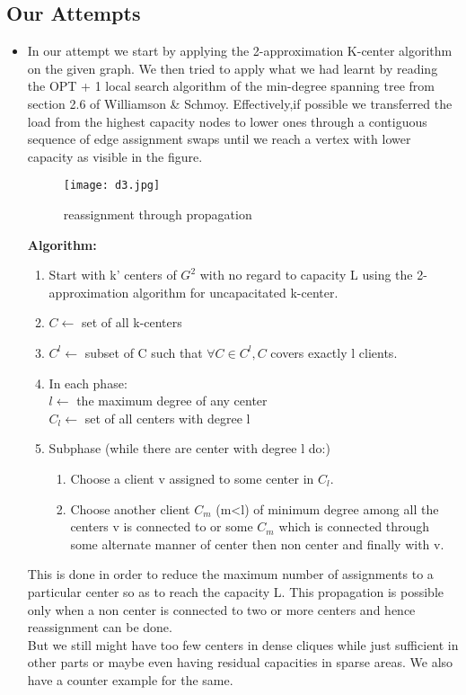 \documentclass[12pt,a4paper,onecolumn]{article}
\begin{document}
\subsection{Our Attempts}
\begin{itemize}
\item In our attempt we start by applying the 2-approximation K-center algorithm on the given graph. We then tried to apply what we had learnt by reading the OPT + 1 local search algorithm of the min-degree spanning tree from section 2.6 of Williamson \& Schmoy. Effectively,if possible we transferred the load from the highest capacity nodes to lower ones through a contiguous sequence of edge assignment swaps until we reach a vertex with lower capacity as visible in the figure. \\
\begin{figure}
\begin{center}
\texttt{[image: d3.jpg]}
  \caption{reassignment through propagation}
  \label{Figure 8}
\end{center}
\end{figure}
\textbf{Algorithm:}
\begin{enumerate}
\item Start with k' centers of $G^2$ with no regard to capacity L using the 2-approximation algorithm for uncapacitated k-center.
\item $C \leftarrow$ set of all k-centers
\item $C^l \leftarrow$ subset of C such that $\forall C \in C^l, C$ covers exactly l clients.
\item In each phase:\\
\hspace{1cm}$l \leftarrow$ the maximum degree of any center\\
\hspace{1cm}$C_l \leftarrow$ set of all centers with degree l
\item Subphase (while there are center with degree l do:)
\begin{enumerate}
\item Choose a client v assigned to some center in $C_l$.
\item Choose another client $C_m$ (m<l) of minimum degree among all the centers v is connected to or some $C_m$ which is connected through some alternate manner of center then non center and finally with v.
\end{enumerate}
\end{enumerate}
This is done in order to reduce the maximum number of assignments to a particular center so as to reach the capacity L. This propagation is possible only when a non center is connected to two or more centers and hence reassignment can be done.\\ But we still might have too few centers in dense cliques while just sufficient in other parts or maybe even having residual capacities in sparse areas. We also have a counter example for the same. \\

\end{itemize}
\end{document}
